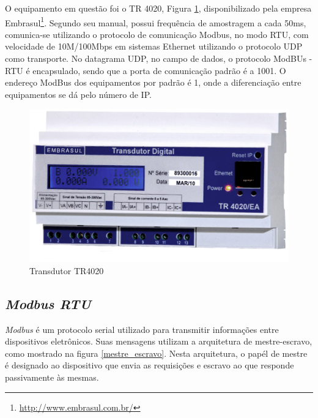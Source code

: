 O equipamento em questão foi o TR 4020, Figura \ref{tr4020}, disponibilizado pela empresa Embrasul\footnote{\url{http://www.embrasul.com.br/}}. Segundo seu manual, possui frequência de amostragem a cada 50ms, comunica-se utilizando o protocolo de comunicação Modbus, no modo RTU, com velocidade de 10M/100Mbps em sistemas Ethernet utilizando o protocolo UDP como transporte. No datagrama UDP, no campo de dados, o protocolo ModBUs - RTU é encapsulado, sendo que a porta de comunicação padrão é a 1001. O endereço ModBus dos equipamentos por padrão é 1, onde a diferenciação entre equipamentos se dá pelo número de IP.

\begin{figure}[!h]
    \centering
    \includegraphics[keepaspectratio=true,scale=0.5]{figuras/tr4020.eps}
    \caption{Transdutor TR4020}
    \label{tr4020}
\end{figure}

    \subsection{\textit{Modbus RTU}}

    \textit{Modbus} \cite{modbus} é um protocolo serial utilizado para transmitir informações entre dispositivos eletrônicos. Suas mensagens utilizam a arquitetura de mestre-escravo, como mostrado na figura \ref{mestre_escravo}. Nesta arquitetura, o papél de mestre é designado ao dispositivo que envia as requisições e escravo ao que responde passivamente às mesmas.

